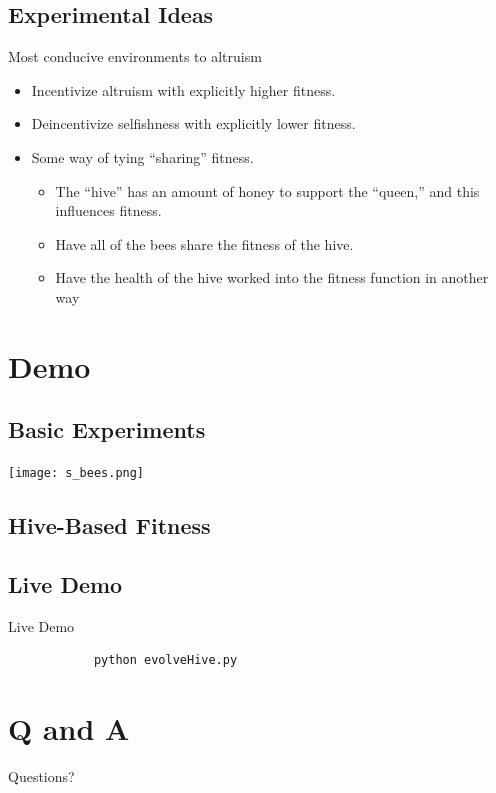 \documentclass{beamer}
\begin{document}
	\subsection{Experimental Ideas}
	\begin{frame}{Most conducive environments to altruism}
		\begin{itemize}
			\item Incentivize altruism with explicitly higher fitness.
			\item Deincentivize selfishness with explicitly lower fitness.

			\item Some way of tying ``sharing'' fitness.
			\begin{itemize}
				\item The ``hive'' has an amount of honey to support the ``queen,'' and this influences fitness.
				\item Have all of the bees share the fitness of the hive.
				\item Have the health of the hive worked into the fitness function in another way
			\end{itemize}
		\end{itemize}
	\end{frame}


	\section{Demo}

	\subsection{Basic Experiments}

	\begin{frame}
		\texttt{[image: s\_bees.png]}
	\end{frame}

	\subsection{Hive-Based Fitness}

	\begin{frame}
		
	\end{frame}


	\subsection{Live Demo}
	\begin{frame}[fragile]{Live Demo}
		\begin{verbatim}
			python evolveHive.py
		\end{verbatim}
	\end{frame}

	\section{Q and A}
	\begin{frame}{Questions?}
		\titlepage
	\end{frame}
\end{document}
